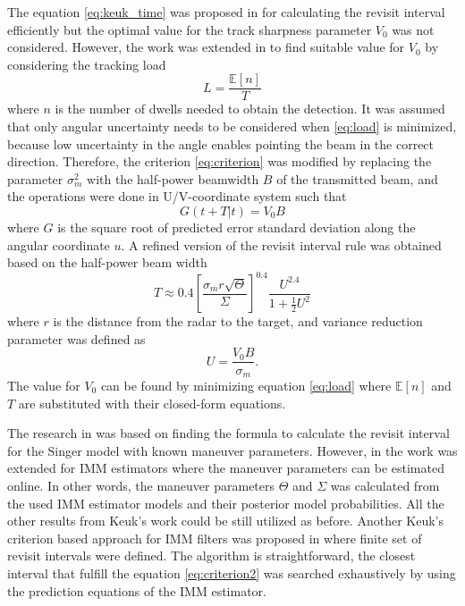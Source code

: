 \documentclass[english, 12pt, a4paper, elec, utf8, a-1b, online]{aaltothesis}
\newcommand{\E}[1]{\mathbb{E}\left[ #1 \right]}
\begin{document}
The equation \eqref{eq:keuk_time} was proposed in \cite{Keuk1975} for calculating the revisit interval efficiently but the optimal value for the track sharpness parameter $V_0$ was not considered.
However, the work was extended in \cite{vanKeuk1993} to find suitable value for $V_0$ by considering the tracking load
\begin{equation}\label{eq:load}
    L = \frac{\E{n}}{T}
\end{equation}
where $n$ is the number of dwells needed to obtain the detection.
It was assumed that only angular uncertainty needs to be considered when \eqref{eq:load} is minimized, 
because low uncertainty in the angle enables pointing the beam in the correct direction.
Therefore, the criterion \eqref{eq:criterion} was modified by replacing the parameter $\sigma_m^2$ with the half-power beamwidth $B$ of the transmitted beam, and the operations were done in U/V-coordinate system such that
\begin{equation} \label{eq:criterion2}
    G(t + T | t) = V_0 B
\end{equation}
where $G$ is the square root of predicted error standard deviation along the angular coordinate $u$. 
A refined version of the revisit interval rule was obtained based on the half-power beam width
\begin{equation}\label{eq:van_keuk_revisited}
    T \approx 0.4 \left[ \frac{\sigma_m r \sqrt{\Theta}}{\Sigma} \right]^{0.4} \frac{U^{2.4}}{1+\frac{1}{2}U^2}
\end{equation}
where $r$ is the distance from the radar to the target, and variance reduction parameter was defined as
\begin{equation}
    U = \frac{V_0 B}{\sigma_m}.
\end{equation}
The value for $V_0$ can be found by minimizing equation \eqref{eq:load} where $\E{n}$ and $T$ are substituted with their closed-form equations.

The research in \cite{Keuk1975, vanKeuk1993} was based on finding the formula to calculate the revisit interval for the Singer model with known maneuver parameters.
However, in \cite{Shin1995} the work was extended for IMM estimators where the maneuver parameters can be estimated online.
In other words, the maneuver parameters $\Theta$ and $\Sigma$ was calculated from the used IMM estimator models and their posterior model probabilities.
All the other results from Keuk's work could be still utilized as before.
Another Keuk's criterion based approach for IMM filters was proposed in \cite{Daeipour1994} where finite set of revisit intervals were defined.
The algorithm is straightforward, the closest interval that fulfill the equation \eqref{eq:criterion2} was searched exhaustively by using the prediction equations of the IMM estimator.
\end{document}
